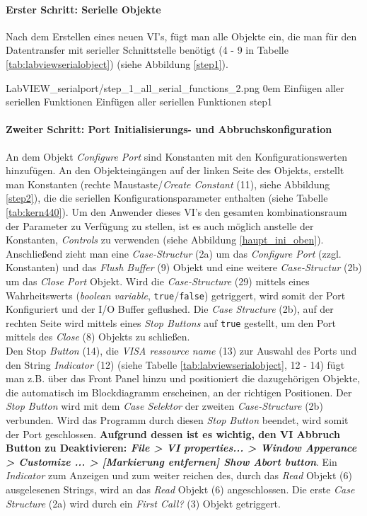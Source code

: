 \paragraph{Erster Schritt: Serielle Objekte} Nach dem Erstellen eines neuen VI's, fügt man alle Objekte ein, die man für den Datentransfer mit serieller Schnittstelle benötigt (4 - 9 in Tabelle \ref{tab:labviewserialobject}) (siehe Abbildung \ref{step1}). 

{LabVIEW_serialport/step_1_all_serial_functions_2.png}
{0em}
{Einfügen aller seriellen Funktionen}
{Einfügen aller seriellen Funktionen}
{step1}


\paragraph{Zweiter Schritt: Port Initialisierungs- und Abbruchskonfiguration} An dem Objekt \textit{Configure Port} sind Konstanten mit den Konfigurationswerten hinzufügen. An den Objekteingängen auf der linken Seite des Objekts, erstellt man Konstanten (rechte Maustaste/\textit{Create Constant} (11), siehe Abbildung \ref{step2}), die die seriellen Konfigurationsparameter enthalten (siehe Tabelle \ref{tab:kern440}). Um den Anwender dieses VI's den gesamten kombinationsraum der Parameter zu Verfügung zu stellen, ist es auch möglich anstelle der Konstanten, \textit{Controls} zu verwenden (siehe Abbildung \ref{haupt_ini_oben}). Anschließend zieht man eine \textit{Case-Structur} (2a) um das \textit{Configure Port} (zzgl. Konstanten) und das \textit{Flush Buffer} (9) Objekt und eine weitere \textit{Case-Structur} (2b) um das \textit{Close Port} Objekt. Wird die \textit{Case-Structure} (29) mittels eines Wahrheitswerts (\textit{boolean variable}, \texttt{true}/\texttt{false}) getriggert, wird somit der Port Konfiguriert und der I/O Buffer geflushed. Die \textit{Case Structure} (2b), auf der rechten Seite wird mittels eines \textit{Stop Buttons} auf \texttt{true} gestellt, um den Port mittels des \textit{Close} (8) Objekts zu schließen.\\

\noindent Den Stop \textit{Button} (14), die \textit{VISA ressource name} (13) zur Auswahl des Ports und den String \textit{Indicator} (12) (siehe Tabelle \ref{tab:labviewserialobject}, 12 - 14) fügt man z.B. über das Front Panel hinzu und positioniert die dazugehörigen Objekte, die automatisch im Blockdiagramm erscheinen, an der richtigen Positionen. Der \textit{Stop Button} wird mit dem \textit{Case Selektor} der zweiten \textit{Case-Structure} (2b) verbunden. Wird das Programm durch diesen \textit{Stop Button} beendet, wird somit der Port geschlossen. \textbf{Aufgrund dessen ist es wichtig, den VI Abbruch Button zu Deaktivieren: \emph{File > VI properties... > Window Apperance > Customize ... > [Markierung entfernen] Show Abort button}}. Ein \textit{Indicator} zum Anzeigen und zum weiter reichen des, durch das \textit{Read} Objekt (6) ausgelesenen Strings, wird an das \textit{Read} Objekt (6) angeschlossen. Die erste \textit{Case Structure} (2a) wird durch ein \textit{First Call?} (3) Objekt getriggert.\\

